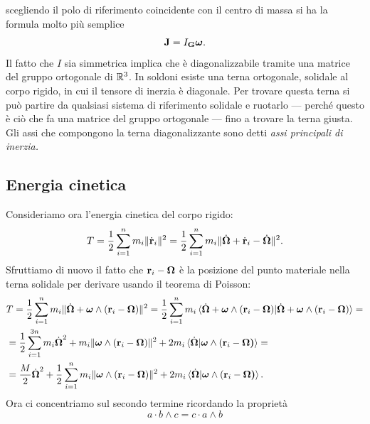     scegliendo il polo di riferimento coincidente con il centro di massa si ha la formula molto più semplice
    \begin{equation}
        \mathbf{J} = I_{\mathbf{G}}\boldsymbol{\omega}.
    \end{equation}
    Il fatto che $I$ sia simmetrica implica che è diagonalizzabile tramite una matrice del gruppo ortogonale di $\mathbb{R}^3$. In soldoni esiste una terna ortogonale, solidale al corpo rigido, in cui il tensore di inerzia è diagonale. Per trovare questa terna si può partire da qualsiasi sistema di riferimento solidale e ruotarlo --- perché questo è ciò che fa una matrice del gruppo ortogonale --- fino a trovare la terna giusta. Gli assi che compongono la terna diagonalizzante sono detti \emph{assi principali di inerzia.}
    
    
\subsection{Energia cinetica}
    Consideriamo ora l'energia cinetica del corpo rigido:
    \begin{equation}
        T = \frac{1}{2}\sum_{i=1}^n m_i\|\dot{\mathbf{r}}_i\|^2 = \frac{1}{2}\sum_{i=1}^n m_i\|\dot{\boldsymbol{\Omega}}+\dot{\mathbf{r}}_i-\dot{\boldsymbol{\Omega}}\|^2 .
    \end{equation}
    Sfruttiamo di nuovo il fatto che $\mathbf{r}_i-\boldsymbol{\Omega}$ è la posizione del punto materiale nella terna solidale per derivare usando il teorema di Poisson:
    \begin{equation}
        \begin{aligned}
            &T = \frac{1}{2}\sum_{i=1}^n m_i\|\dot{\boldsymbol{\Omega}}+\boldsymbol{\omega}\wedge(\mathbf{r}_i-\boldsymbol{\Omega})\|^2 = \frac{1}{2}\sum_{i=1}^n m_i\braket{\dot{\boldsymbol{\Omega}}+\boldsymbol{\omega}\wedge(\mathbf{r}_i-\boldsymbol{\Omega})|\dot{\boldsymbol{\Omega}}+\boldsymbol{\omega}\wedge(\mathbf{r}_i-\boldsymbol{\Omega})}=\\
            &=\frac{1}{2}\sum_{i=1}^{3n}m_i\dot{\boldsymbol{\Omega}}^2+ m_i\|\boldsymbol{\omega}\wedge(\mathbf{r}_i-\boldsymbol{\Omega})\|^2 + 2m_i \braket{\dot{\boldsymbol{\Omega}}|\boldsymbol{\omega}\wedge(\mathbf{r}_i-\boldsymbol{\Omega)}} =\\
            &= \frac{M}{2}\dot{\boldsymbol{\Omega}}^2 + \frac{1}{2}\sum_{i=1}^n m_i\|\boldsymbol{\omega}\wedge(\mathbf{r}_i-\boldsymbol{\Omega})\|^2+ 2m_i \braket{\dot{\boldsymbol{\Omega}}|\boldsymbol{\omega}\wedge(\mathbf{r}_i-\boldsymbol{\Omega)}}.
        \end{aligned}
    \end{equation}
    Ora ci concentriamo sul secondo termine ricordando la proprietà
    \begin{equation}
        a\cdot b\wedge c = c\cdot a \wedge b
    \end{equation}
